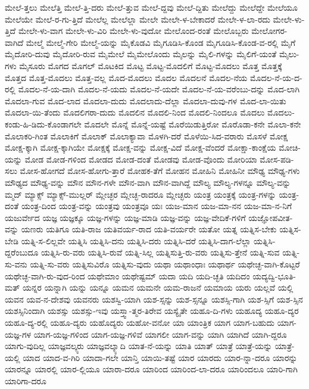 {ಮೇಲೆ-ತ್ತಲು
ಮೇಲೆತ್ತಿ
ಮೇಲೆ-ತ್ತಿ-ದರು
ಮೇಲೆ-ತ್ತುವ
ಮೇಲೆ-ದ್ದವು
ಮೇಲೆ-ದ್ದಿತು
ಮೇಲೆದ್ದು
ಮೇಲೆದ್ದೇ
ಮೇಲೆಯೂ
ಮೇಲೆಯೇ
ಮೇಲೆ-ರ-ಗು-ತ್ತಿದೆ
ಮೇಲೆಲ್ಲ
ಮೇಲೆಲ್ಲಾ
ಮೇಲೇ
ಮೇಲೇ-ಳ-ಬೇಕಾದರೆ
ಮೇಲೇ-ಳ-ಲಾ-ರದು
ಮೇಲೇ-ಳು-ತ್ತಿದೆ
ಮೇಲೇ-ಳು-ವಾಗ
ಮೇಲೇ-ಳು-ವಿರಿ
ಮೇಲೇ-ಳು-ವುದೋ
ಮೇಲೊಂದ-ರಂತೆ
ಮೇಲೊಬ್ಬರು
ಮೇಲೋಗರ-ವಾಗಿದೆ
ಮೇಲ್ಮೆ
ಮೇಲ್ಮೆ-ಗೇರಿ
ಮೇಲ್ಮೆ-ಯನ್ನು
ಮೈಕೊಡವಿ
ಮೈಗೂಡಿಸಿ-ಕೊಂಡ
ಮೈಗೂಡಿಸಿ-ಕೊಂಡ-ವ-ರಲ್ಲಿ
ಮೈಗೆ
ಮೈದೋರಿ-ದುವು
ಮೈದೋರಿ-ರುವ
ಮೈಮೇಲೆ
ಮೈಮೇಲೊಂದು
ಮೈಲನ್ನು
ಮೈಲಿ-ಗಳನ್ನು
ಮೈಲಿಗೆ-ಯಂತೆ
ಮೈಲು-ಗಳು
ಮೈಸೂರು
ಮೊಗದ
ಮೊಗಲ್
ಮೊಟಕಿದ
ಮೊಟ್ಟ
ಮೊಟ್ಟ-ಮೊದಲಿಗೆ
ಮೊಟ್ಟ-ಮೊದಲು
ಮೊತ್ತ
ಮೊತ್ತಕ್ಕೆ
ಮೊತ್ತದ
ಮೊತ್ತ-ಮೊದಲು
ಮೊತ್ತ-ವಲ್ಲ
ಮೊದ-ಮೊದಲು
ಮೊದಲ
ಮೊದಲನೆ
ಮೊದಲ-ನೆಯ
ಮೊದಲ-ನೆ-ಯ-ದ-ರಲ್ಲಿ
ಮೊದಲ-ನೆ-ಯ-ದಾಗಿ
ಮೊದಲ-ನೆ-ಯದು
ಮೊದಲ-ನೆ-ಯದೇ
ಮೊದಲ-ನೆ-ಯ-ವರೆಂಬು-ದನ್ನು
ಮೊದ-ಲಾಗಿ
ಮೊದಲಾ-ಗುವ
ಮೊದ-ಲಾದ
ಮೊದಲಾ-ದುದು
ಮೊದಲಾದು-ದೆಲ್ಲಾ
ಮೊದಲಾ-ದುವು-ಗಳ
ಮೊದ-ಲಾ-ಯಿತು
ಮೊದಲಾ-ಯಿ-ತೆಂದು
ಮೊದಲಿಗರಾ-ದುದು
ಮೊದಲಿನ
ಮೊದಲಿ-ನಿಂದ
ಮೊದಲಿ-ನಿಂದಲೂ
ಮೊದಲು
ಮೊದಲು-ಕಂಡು-ಹಿ-ಡಿದು-ಕೊಂಡಾಗಲೇ
ಮೊದಲೇ
ಮೊನ್ನೆ
ಮೊನ್ನೆ-ಯಷ್ಟೆ
ಮೊರೆಯಿಡುತ್ತಿರೋ
ಮೊರೊಡಾ-ಕನೇ
ಮೊಲಾ-ಕನೇ
ಮೊಲಾಕರಿ-ಗಿಂತ
ಮೊಲಾಕಿಗೆ
ಮೊಲಾಕ್
ಮೊಲಾಕ್ಯಾವಾ
ಮೊಳಗಿ-ದರೆ
ಮೊಳೆಯಿ-ಸಿದ-ವರಾರು
ಮೊಸಳೆ
ಮೋಕ್ಷ
ಮೋಕ್ಷ-ಕ್ಕಾಗಿ
ಮೋಕ್ಷ-ಕ್ಕಾಗಿಯೇ
ಮೋಕ್ಷಕ್ಕೆ
ಮೋಕ್ಷ-ವನ್ನು
ಮೋಕ್ಷ-ವಿದೆ
ಮೋಕ್ಷ-ವೆಂದರೆ
ಮೋಕ್ಷಾ-ಕಾಂಕ್ಷೆಯ
ಮೋಚಿ-ಯನ್ನು
ಮೋಡ
ಮೋಡ-ಗಳಿಂದ
ಮೋಡದ
ಮೋಡ-ದಂತೆ
ಮೋಡವು
ಮೋಡ-ವೊಂದು
ಮೋರಿಯಾ
ಮೋಸ-ಪಡಿ-ಸಲು
ಮೋಸ-ಹೋಗದೆ
ಮೋಸ-ಹೋಗು-ತ್ತಾರೆ
ಮೋಹಕ-ತೆಗೆ
ಮೋಹನ
ಮೋಹಿನಿ
ಮೋಹಿನೀ
ಮೌಢ್ಯ
ಮೌಢ್ಯ-ಗಳು
ಮೌಢ್ಯದ
ಮೌಢ್ಯ-ವನ್ನು
ಮೌನ
ಮೌನ-ಗಳೇ
ಮೌನ-ವಾಗಿ
ಮೌನ-ವಾಗಿದ್ದೆ
ಮೌಲ್ಯ
ಮೌಲ್ಯ-ಗಳನ್ನೂ
ಮೌಲ್ಯ-ವನ್ನು
ಮ್ಮದ್
ಮ್ಯಾಕ್ಸ್
ಮ್ಯಾಕ್ಸ್-ಮುಲ್ಲರ್
ಮ್ಲೇಚ್ಛರ
ಮ್ಲೇಚ್ಛ-ರಾದರೂ
ಮ್ಲೇಚ್ಛರು
ಯಂತ್ರ
ಯಂತ್ರಕ್ಕೆ
ಯಂತ್ರ-ಗಳನ್ನು
ಯಂತ್ರ-ದಂತೆ
ಯಂತ್ರ-ದಿಂದ
ಯಂತ್ರ-ವನ್ನು
ಯಂತ್ರವು
ಯಂತ್ರವೂ
ಯಃ
ಯಜ-ಮಾನ
ಯಜ-ಮಾ-ನನ
ಯಜ-ಮಾ-ನ-ನಿಗೆ
ಯಜುರ್ವೇದ
ಯಜ್ಞ
ಯಜ್ಞಕ್ಕೂ
ಯಜ್ಞ-ಗಳನ್ನು
ಯಜ್ಞ-ಮಾಡಿ
ಯಜ್ಞ-ವನ್ನು
ಯಜ್ಞ-ವೇದಿಕೆ-ಗಳಿಗೆ
ಯಜ್ಞೋಪವೀತ-ವನ್ನು
ಯಣರು
ಯತಿಗೂ
ಯತಿ-ರಾಜ
ಯತಿವರ್ಯ-ರಾದ
ಯತಿ-ವರ್ಯರೇ
ಯತೋ
ಯತ್ನ
ಯತ್ನಿಸ-ಬೇಕು
ಯತ್ನಿಸ-ಬೇಡಿ
ಯತ್ನಿ-ಸ-ಲಿಲ್ಲವೇ
ಯತ್ನಿಸಿ
ಯತ್ನಿಸಿ-ದನು
ಯತ್ನಿಸಿ-ದರು
ಯತ್ನಿಸಿ-ದರೆ
ಯತ್ನಿಸಿ-ದಾಗ-ಲೆಲ್ಲಾ
ಯತ್ನಿಸಿ-ದ್ದರೆಂಬುದೂ
ಯತ್ನಿಸಿ-ರು-ವರು
ಯತ್ನಿಸಿ-ರುವೆ
ಯತ್ನಿ-ಸಿಲ್ಲ
ಯತ್ನಿಸುತ್ತಿ-ರು-ವರು
ಯತ್ನಿಸು-ತ್ತೇನೆ
ಯತ್ನಿ-ಸುವ
ಯತ್ನಿ-ಸು-ವನು
ಯತ್ನಿ-ಸು-ವರು
ಯತ್ನಿಸುವಿರೊ
ಯತ್ನಿಸು-ವುದು
ಯಥಾ
ಯಥಾಂಧಾಃ
ಯಥಾರ್ಥ
ಯಥೇಚ್ಛ-ವಾಗಿ-ಕೊಟ್ಟರೆ
ಯಥೇಚ್ಛ-ವಾಗಿ-ರು-ವುದ-ರಿಂದ
ಯಥೇಮಾಂ
ಯಥೇಷ್ಟಮ್
ಯದಾ
ಯದಿ
ಯದಿ-ಚ್ಛತಿ
ಯದಿದಂ
ಯದ್ಯದ್ವಿ-ಭೂತಿ-ಮತ್
ಯನ್ನರ
ಯನ್ನಾಗಿ
ಯನ್ನು
ಯನ್ನೂ
ಯಮನ
ಯಮನೇ
ಯಮ-ರಾಜನೆ
ಯಮಾಯ
ಯರು
ಯಲ್ಲವೆ
ಯಲ್ಲಿ
ಯವನ
ಯವ-ನ-ದೇಶವು
ಯವನರು
ಯಶಸ್ವಿ-ಯಾಗಿ
ಯಶ-ಸ್ಸನ್ನು
ಯಶ-ಸ್ಸನ್ನೂ
ಯಶಸ್ಸಿ-ಗಾಗಿ
ಯಶ-ಸ್ಸಿಗೆ
ಯಶ-ಸ್ಸಿನ
ಯಶಸ್ಸಿನಿಂದಾಗಿ
ಯಶಸ್ಸು
ಯಶಸ್ಸು-ಇವು
ಯಸ್ತ್ವಾ-ತ್ಮರ-ತಿರೇವ
ಯಸ್ಯೈತೇ
ಯಹೂ-ದಿ-ಗಳು
ಯಹೂದ್ಯ
ಯಹೂ-ದ್ಯರ
ಯಹೂ-ದ್ಯ-ರಲ್ಲಿ
ಯಹೂ-ದ್ಯರು
ಯಹೊದ್ಯರು
ಯಹೋ-ವನೋ
ಯಾ
ಯಾಂತ್ರಿಕ
ಯಾಗ
ಯಾಗ-ಬಹುದು
ಯಾಗ-ಯಜ್ಞ-ಗಳ
ಯಾಗ-ಯಜ್ಞ-ಗಳಿಂದ
ಯಾಗ-ಯಜ್ಞ-ಗಳಿವೆ
ಯಾಗಲೀ
ಯಾಗ-ವನ್ನು
ಯಾಗಿ
ಯಾಗಿದೆ
ಯಾಗಿ-ದ್ದರೂ
ಯಾಗು-ವುದಿಲ್ಲ
ಯಾಜ್ಞವಲ್ಕ್ಯರು
ಯಾಜ್ಞವಲ್ಕ್ಯಾದಿ
ಯಾತ-ನೆ-ಯನ್ನು
ಯಾತಿ
ಯಾತ್
ಯಾತ್ರೆ
ಯಾತ್ರೆ-ಯನ್ನು
ಯಾತ್ರೆ-ಯಲ್ಲಿ
ಯಾದ
ಯಾದ-ವ-ಗಿರಿ
ಯಾದಾ-ಗಲೇ
ಯಾನ್ತಿ
ಯಾಯಿ-ತಷ್ಟೆ
ಯಾರ
ಯಾರದು
ಯಾರ-ನ್ನಾ-ದರೂ
ಯಾರನ್ನು
ಯಾರನ್ನೂ
ಯಾರಲ್ಲಿ
ಯಾರ-ಲ್ಲಿಯೂ
ಯಾರಾ-ದರೂ
ಯಾರಿಂದ
ಯಾರಿಂದ-ಲಾ-ದರೂ
ಯಾರಿಂದಲೂ
ಯಾರಿ-ಗಾಗಿ
ಯಾರಿಗಾ-ದರೂ
}
